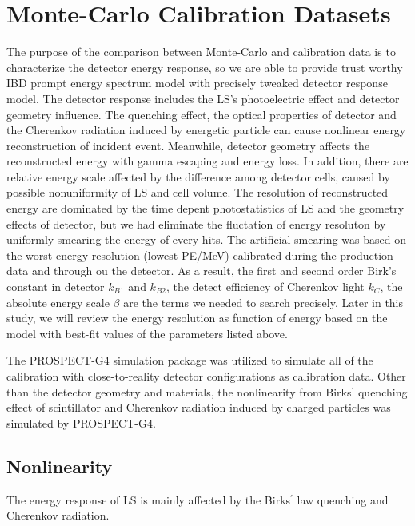 \section{Monte-Carlo Calibration Datasets}
The purpose of the comparison between Monte-Carlo and calibration data is to characterize the detector energy response, so we are able to provide trust worthy IBD prompt energy spectrum model with precisely tweaked detector response model.
The detector response includes the LS's photoelectric effect and detector geometry influence. 
The quenching effect, the optical properties of detector and the Cherenkov radiation induced by energetic particle can cause nonlinear energy reconstruction of incident event.
Meanwhile, detector geometry affects the reconstructed energy with gamma escaping and energy loss.
In addition, there are relative energy scale affected by the difference among detector cells, caused by possible nonuniformity of LS and cell volume.
The resolution of reconstructed energy are dominated by the time depent photostatistics of LS and the geometry effects of detector, but we had eliminate the fluctation of energy resoluton by uniformly smearing the energy of every hits.
The artificial smearing was based on the worst energy resolution (lowest PE/MeV) calibrated during the production data and through ou the detector.
As a result, the first and second order Birk’s constant in detector $k_{B1}$ and $k_{B2}$, the detect efficiency of Cherenkov light $k_{C}$, the absolute energy scale $\beta$ are the terms we needed to search precisely. 
Later in this study, we will review the energy resolution as function of energy based on the model with best-fit values of the parameters listed above.

The PROSPECT-G4 simulation package was utilized to simulate all of the calibration with close-to-reality detector configurations as calibration data.
Other than the detector geometry and materials, the nonlinearity from Birks$^\prime$ quenching effect of scintillator and Cherenkov radiation induced by charged particles was simulated by PROSPECT-G4.

\subsection{Nonlinearity}
\label{sec:nonlinear}
The energy response of LS is mainly affected by the Birks$^\prime$ law quenching and Cherenkov radiation. 


